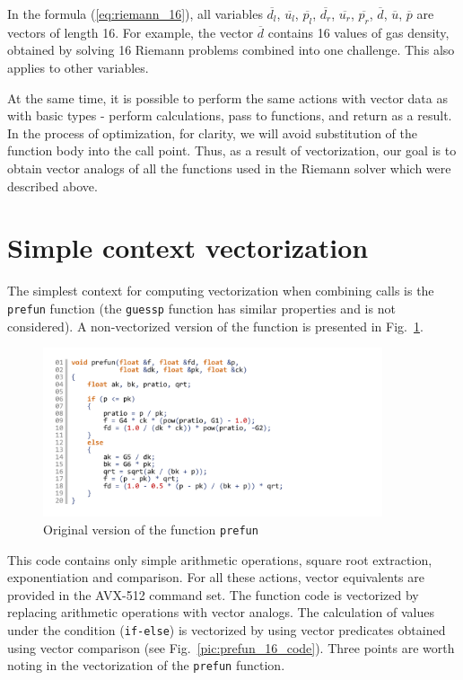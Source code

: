 \documentclass[utf8,english]{psta}%
\begin{document}
In the formula (\ref{eq:riemann_16}), all variables $\overline{d_l}$, $\overline{u_l}$, $\overline{p_l}$, $\overline{d_r}$, $\overline{u_r}$, $\overline{p_r}$, $\overline{d}$, $\overline{u}$, $\overline{p}$ are vectors of length 16.
For example, the vector $\overline{d}$ contains 16 values of gas density, obtained by solving 16 Riemann problems combined into one challenge.
This also applies to other variables.

At the same time, it is possible to perform the same actions with vector data as with basic types - perform calculations, pass to functions, and return as a result.
In the process of optimization, for clarity, we will avoid substitution of the function body into the call point.
Thus, as a result of vectorization, our goal is to obtain vector analogs of all the functions used in the Riemann solver which were described above.

\section{Simple context vectorization}

The simplest context for computing vectorization when combining calls is the \texttt{prefun} function (the \texttt{guessp} function has similar properties and is not considered).
A non-vectorized version of the function is presented in Fig.~\ref{pic:prefun_code}.

\begin{figure}
\includegraphics[width=10cm]{pics/pic_prefun_code}
\caption{Original version of the function \texttt{prefun}}
\label{pic:prefun_code}
\end{figure}

This code contains only simple arithmetic operations, square root extraction, exponentiation and comparison.
For all these actions, vector equivalents are provided in the AVX-512 command set.
The function code is vectorized by replacing arithmetic operations with vector analogs.
The calculation of values under the condition (\texttt{if-else}) is vectorized by using vector predicates obtained using vector comparison (see Fig.~\ref{pic:prefun_16_code}).
Three points are worth noting in the vectorization of the \texttt{prefun} function.
\end{document}

